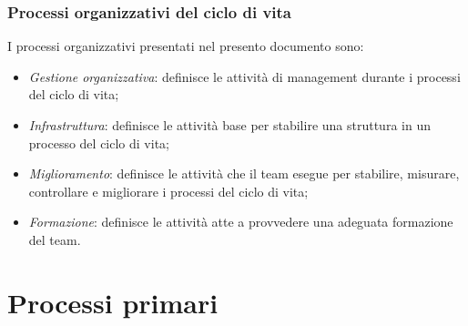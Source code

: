 \documentclass[10pt, a4paper]{article}
\begin{document}
\subsubsection{Processi organizzativi del ciclo di vita}
I processi organizzativi presentati nel presento documento sono:
\begin{itemize}
    \item \textit{Gestione organizzativa}: definisce le attività di management durante i processi del ciclo di vita;
    \item \textit{Infrastruttura}: definisce le attività base per stabilire una struttura in un processo del ciclo di vita;
    \item \textit{Miglioramento}: definisce le attività che il team esegue per stabilire, misurare, controllare e migliorare i processi del ciclo di vita;
    \item \textit{Formazione}: definisce le attività atte a provvedere una adeguata formazione del team.
\end{itemize}

\newpage

\section{Processi primari}
\end{document}
